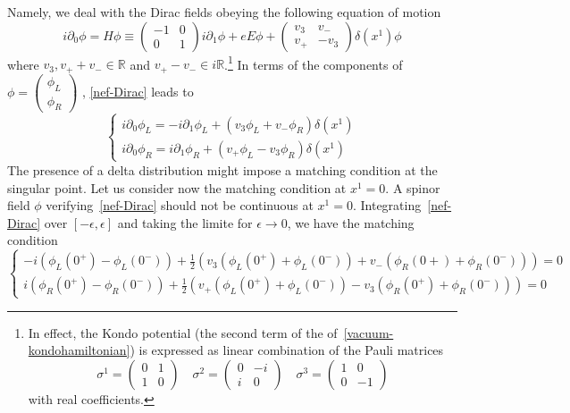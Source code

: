 Namely, we deal with the Dirac fields obeying the following equation of motion
\begin{equation}\label{nef-Dirac}
i \partial_0 \phi = H\phi \equiv
\begin{pmatrix} 
-1 & 0 \\
0 & 1 
\end{pmatrix} i \partial_1 \phi 
+ eE\phi
+
\begin{pmatrix}
v_3 & v_- \\
v_+ & -v_3
\end{pmatrix} \delta(x^1) \phi
\end{equation}
where $v_3, v_+ + v_- \in \mathbb{R}$ and $ v_+ - v_-\in i \mathbb{R}$.\footnote{
In effect, the Kondo potential (the second term of the \rhs of~\cref{vacuum-kondohamiltonian}) is expressed as linear combination of the Pauli matrices
\begin{equation*}
\sigma^1 = \begin{pmatrix} 0 & 1 \\ 1 & 0 \end{pmatrix} \quad
\sigma^2 = \begin{pmatrix} 0 & -i \\ i & 0 \end{pmatrix} \quad
\sigma^3 = \begin{pmatrix} 1 & 0 \\ 0 & -1 \end{pmatrix} 
\end{equation*}
with real coefficients.
}
In terms of the components of $\phi =
\begin{pmatrix}
\phi_L \\
\phi_R
\end{pmatrix}$
, \cref{nef-Dirac} leads to
\begin{equation}
\begin{cases}
i \partial_0 \phi_L = -i\partial_1 \phi_L + (v_3 \phi_L + v_- \phi_R) \delta(x^1) \\
i \partial_0 \phi_R = i\partial_1 \phi_R + (v_+ \phi_L - v_3 \phi_R) \delta(x^1)
\end{cases}
\end{equation}
The presence of a delta distribution might impose a matching condition at the singular point.
Let us consider now the matching condition at $x^1=0$.
A spinor field $\phi$ verifying~\cref{nef-Dirac} should not be continuous at $x^1 = 0$. 
Integrating~\cref{nef-Dirac} over $[-\epsilon, \epsilon]$ and taking the limite for $\epsilon \rightarrow 0$,
we have the matching condition
\begin{equation}\label{nef-matching}
\begin{cases}
-i(\phi_L(0^+) - \phi_L(0^-)) + \frac{1}{2}(v_3 (\phi_L(0^+) + \phi_L(0^-))+ v_- (\phi_R(0+) + \phi_R(0^-))) = 0 \\
i(\phi_R(0^+) - \phi_R(0^-)) + \frac{1}{2}(v_+ (\phi_L(0^+) + \phi_L(0^-)) - v_3 (\phi_R(0^+) + \phi_R(0^-))) = 0
\end{cases}
\end{equation}
